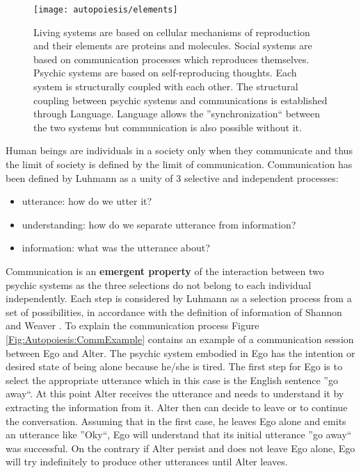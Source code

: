 \begin{figure}[htbp]
\begin{center}
\texttt{[image: autopoiesis/elements]}
\end{center}
\small{
\caption[Communication is the basis for society]{Living systems are based
on cellular mechanisms of reproduction and
their elements are proteins and molecules. Social systems are based on communication
processes which reproduces themselves. Psychic systems are based on self-reproducing
thoughts. Each system is structurally coupled with each other.
The structural coupling between psychic systems and communications is established
through Language. Language allows the ''synchronization`` between the two systems
but communication is also possible without it.
\label{Fig:Autopoiesis:Communication}}}
\end{figure}

Human beings are individuals in a society only when they communicate and
thus the limit of society is defined by the limit of communication.
Communication has been defined by Luhmann as a unity of 3 selective
and independent processes:
\begin{itemize}
 \item utterance: how do we utter it?
 \item understanding: how do we separate utterance from information?
 \item information: what was the utterance about?
\end{itemize}
Communication is an \textbf{emergent property} of the interaction between two psychic systems
as the three selections do not belong to each individual independently.
Each step is considered by Luhmann as a selection process from a set of possibilities,
in accordance with the definition of information of Shannon and Weaver \citep{Shannon1948}.
To explain the communication process Figure \ref{Fig:Autopoiesis:CommExample}
contains an example of a communication session between Ego and Alter.
The psychic system embodied in Ego has the intention or desired state of being alone
 because he/she is tired.
The first step for Ego is to select the appropriate utterance which in this case 
is the English sentence ''go away``.
At this point Alter receives the utterance and needs to understand it by extracting the 
information from it.
Alter then can decide to leave or to continue the conversation. Assuming that in the first
case, he leaves Ego alone and emits an utterance like ''Oky``, Ego will understand that 
its initial utterance ''go away`` was successful.
On the contrary if Alter persist and does not leave Ego alone, Ego will try
 indefinitely to produce other utterances until Alter leaves.
 
